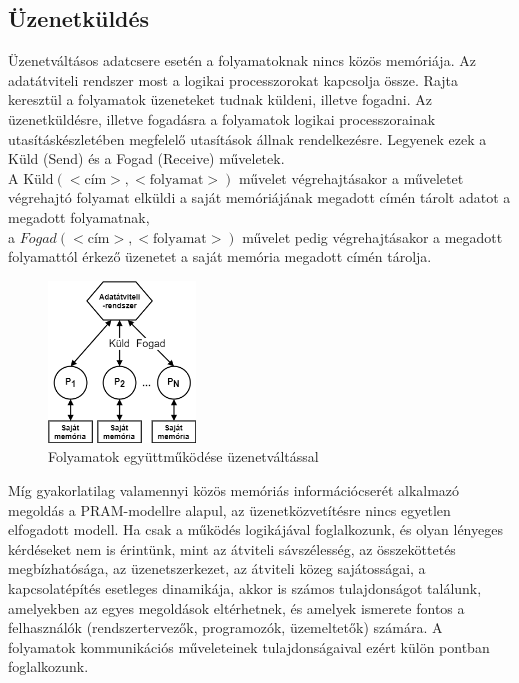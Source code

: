 \documentclass[tikz,12pt,margin=0px]{article}
\begin{document}
	\subsection*{Üzenetküldés}
	
    Üzenetváltásos adatcsere esetén a folyamatoknak nincs közös memóriája. Az adatátviteli rendszer most a logikai processzorokat kapcsolja össze. Rajta keresztül a folyamatok üzeneteket tudnak küldeni, illetve fogadni. Az üzenetküldésre, illetve fogadásra a folyamatok logikai processzorainak utasításkészletében megfelelő utasítások állnak rendelkezésre. Legyenek ezek a Küld (Send) és a Fogad (Receive) műveletek.\\

    \noindent A $\text{Küld}(<\text{cím}>,<\text{folyamat}>)$ művelet végrehajtásakor a műveletet végrehajtó folyamat elküldi a saját memóriájának megadott címén tárolt adatot a megadott folyamatnak,\\ a $Fogad(<\text{cím}>,<\text{folyamat}>)$ művelet pedig végrehajtásakor a megadott folyamattól érkező üzenetet a saját memória megadott címén tárolja.

    \begin{figure}[H]
        \centering
        \includegraphics[width=0.35\textwidth]{img/messaging_sync.png}
        \caption{Folyamatok együttműködése üzenetváltással}
        \label{messaging_sync}
    \end{figure}

    \noindent Míg gyakorlatilag valamennyi közös memóriás információcserét alkalmazó megoldás a PRAM-modellre alapul, az üzenetközvetítésre nincs egyetlen elfogadott modell. Ha csak a működés logikájával foglalkozunk, és olyan lényeges kérdéseket nem is érintünk, mint az átviteli sávszélesség, az összeköttetés megbízhatósága, az üzenetszerkezet, az átviteli közeg sajátosságai, a kapcsolatépítés esetleges dinamikája, akkor is számos tulajdonságot találunk, amelyekben az egyes megoldások eltérhetnek, és amelyek ismerete fontos a felhasználók (rendszertervezők, programozók, üzemeltetők) számára. A folyamatok kommunikációs műveleteinek tulajdonságaival ezért külön pontban foglalkozunk.
\end{document}
